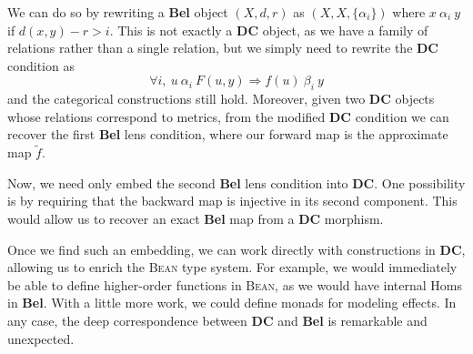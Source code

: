 \documentclass[a4paper]{article}
\newcommand{\DC}{\textbf{DC}}
\newcommand{\Bel}{\textbf{Bel}}
\newcommand{\Bean}{\textsc{Bean}}
\begin{document}
We can do so by rewriting a \Bel{} object $(X,d,r)$ as $(X,X,\{\alpha_i\})$ where $x~\alpha_i~y$ if $d(x,y)-r>i$. This is not exactly a \DC{} object, as we have a family of relations rather than a single relation, but we simply need to rewrite the \DC{} condition as 
\begin{equation*}
    \forall i,~ u~\alpha_i~F(u,y)\Rightarrow f(u)~\beta_i~y
\end{equation*}
and the categorical constructions still hold. Moreover, given two \DC{} objects whose relations correspond to metrics, from the modified \DC{} condition we can recover the first \Bel{} lens condition, where our forward map is the approximate map $\tilde{f}$. 

Now, we need only embed the second \Bel{} lens condition into \DC{}. One possibility is by requiring that the backward map is injective in its second component. This would allow us to recover an exact \Bel{} map from a \DC{} morphism. 

Once we find such an embedding, we can work directly with constructions in \DC{}, allowing us to enrich the \Bean{} type system. For example, we would immediately be able to define higher-order functions in \Bean{}, as we would have internal Homs in \Bel{}. With a little more work, we could define monads for modeling effects. In any case, the deep correspondence between \DC{} and \Bel{} is remarkable and unexpected. 

\printbibliography
\end{document}
